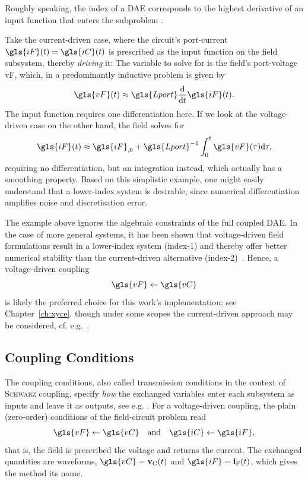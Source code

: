 Roughly speaking, the index of a DAE corresponds to the highest derivative of an input function that enters the subproblem \cite{SchoepsDiss}.

\begin{example}
    Take the current-driven case, where the circuit's port-current $\gls{iF}(t) = \gls{iC}(t)$ is prescribed as the input function on the field subsystem, thereby \textit{driving} it: The variable to solve for is the field's port-voltage \gls{vF}, which, in a predominantly inductive problem is given by
\begin{equation*}
    \gls{vF}(t) \approx \gls{Lport} \frac{\mathrm{d}}{\mathrm{d}t} \gls{iF}(t).
\end{equation*}
The input function requires one differentiation here. If we look at the voltage-driven case on the other hand, the field solves for
\begin{equation*}
    \gls{iF}(t) \approx \gls{iF}_{,0} + \gls{Lport}^{-1} \int_{0}^{t} \gls{vF}(\tau) \mathrm{d}\tau,
\end{equation*}
requiring no differentiation, but an integration instead, which actually has a smoothing property.
Based on this simplistic example, one might easily understand that a lower-index system is desirable, since numerical differentiation amplifies noise and discretisation error.
\end{example}

The example above ignores the algebraic constraints of the full coupled DAE. In the case of more general systems, it has been shown that voltage-driven field formulations result in a lower-index system (index-1) and thereby offer better numerical stability than the current-driven alternative (index-2)~\cite{Garcia2020}. Hence, a voltage-driven coupling
\begin{equation*}
    \gls{vF} \leftarrow \gls{vC}
\end{equation*}
is likely the preferred choice for this work's implementation; see Chapter~\ref{ch:xyce}, though under some scopes the current-driven approach may be considered, cf. e.g.~\cite{Garcia2017}.

\subsection{Coupling Conditions} The coupling conditions, also called transmission conditions in the context of \textsc{Schwarz} coupling, specify \textit{how} the exchanged variables enter each subsystem as inputs and leave it as outputs, see e.g. \cite{Gander2004}. For a voltage-driven coupling, the plain (zero-order) conditions of the field-circuit problem read
\begin{equation}
\label{eq:classical-wr}
	\gls{vF} \leftarrow \gls{vC} \quad \text{and} \quad \gls{iC} \leftarrow \gls{iF},
\end{equation}
that is, the field is prescribed the voltage and returns the current. The exchanged quantities are waveforms, $\gls{vC} = \mathbf{v}_{\text{C}}(t)$ and $\gls{iF} = \mathbf{i}_{\text{F}}(t)$, which gives the method its name.

